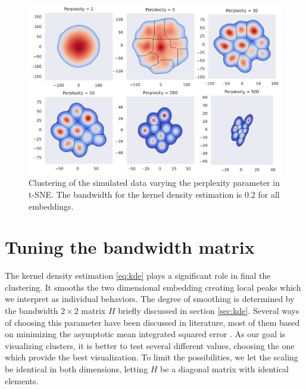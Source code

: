 \documentclass[a4paper]{memoir}
\theoremstyle{plain}
\theoremstyle{definition}
\theoremstyle{remark}
\begin{document}
\begin{figure}[tb]
        \centering
        \includegraphics[width=1\linewidth]{./code/figures/perplexity_tuning_simulated.pdf}
        \caption{Clustering of the simulated data varying the perplexity parameter in t-SNE.
        The bandwidth for the kernel density estimation is 0.2 for all embeddings.}
        \label{fig:perplexity_tuning_simulated}
\end{figure}


\section{Tuning the bandwidth matrix}
The kernel density estimation \eqref{eq:kde} plays a significant role in final the clustering.
It smooths the two dimensional embedding creating local peaks which we interpret as individual behaviors.
The degree of smoothing is determined by the bandwidth $2 \times 2$ matrix $H$ briefly discussed in section \ref{sec:kde}.
Several ways of choosing this parameter have been discussed in literature, most of them based on minimizing the asymptotic mean integrated squared error \cite{simonoff}.
As our goal is visualizing clusters, it is better to test several different values, choosing the one which provide the best visualization.
To limit the possibilities, we let the scaling be identical in both dimensions, letting $H$ be a diagonal matrix with identical elements.


\newpage
\printbibliography
\end{document}
